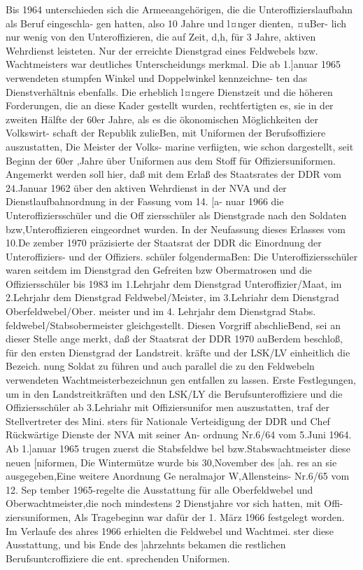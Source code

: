 

Bis 1964 unterschieden sich die Armeeangehörigen,
die die Unteroffizierslaufbahn als Beruf eingeschla-
gen hatten, also 10 Jahre und l¤nger dienten, ¤uBer-
lich nur wenig von den Unteroffizieren, die auf
Zeit, d,h, für 3 Jahre, aktiven Wehrdienst leisteten.
Nur der erreichte Dienstgrad eines Feldwebels bzw.
Wachtmeisters war deutliches Unterscheidungs
merkmal. Die ab 1.]anuar 1965 verwendeten
stumpfen Winkel und Doppelwinkel kennzeichne-
ten das Dienstverhältnis ebenfalls. Die erheblich
l¤ngere Dienstzeit und die höheren Forderungen,
die an diese Kader gestellt wurden, rechtfertigten
es, sie in der zweiten Hälfte der 60er Jahre, als es
die ökonomischen Möglichkeiten der Volkswirt-
schaft der Republik zulieBen, mit Uniformen der
Berufsoffiziere auszustatten, Die Meister der Volks-
marine verfiigten, wie schon dargestellt, seit Beginn
der 60er ,Jahre über Uniformen aus dem Stoff für
Offiziersuniformen.
Angemerkt werden soll hier, daß mit dem Erlaß
des Staatsrates der DDR vom 24.Januar 1962 über
den aktiven Wehrdienst in der NVA und der Dienstlaufbahnordnung in der Fassung vom 14. [a-
nuar 1966 die Unteroffiziersschüler und die Off
ziersschüler als Dienstgrade nach den Soldaten
bzw,Unteroffizieren eingeordnet wurden.
In der Neufassung dieses Erlasses vom 10.De
zember 1970 präzisierte der Staatsrat der DDR dic
Einordnung der Unteroffiziers- und der Offiziers.
schüler folgendermaBen: Die Unteroffiziersschüler
waren seitdem im Dienstgrad den Gefreiten bzw
Obermatrosen und die Offiziersschüler bis 1983 im
1.Lehrjahr dem Dienstgrad Unteroffizier/Maat, im
2.Lehrjahr dem Dienstgrad Feldwebel/Meister, im
3.Lehriahr dem Dienstgrad Oberfeldwebel/Ober.
meister und im 4. Lehrjahr dem Dienstgrad Stabs.
feldwebel/Stabsobermeister gleichgestellt. Diesen
Vorgriff abschlieBend, sei an dieser Stelle ange
merkt, daß der Staatsrat der DDR 1970 auBerdem
beschloß, für den ersten Dienstgrad der Landstreit.
kräfte und der LSK/LV einheitlich die Bezeich.
nung Soldat zu führen und auch parallel die zu den
Feldwebeln verwendeten Wachtmeisterbezeichnun
gen entfallen zu lassen.
Erste Festlegungen, um in den Landstreitkräften
und den LSK/LY die Berufsunteroffiziere und die
Offiziersschüler ab 3.Lehriahr mit Offiziersunifor
men auszustatten, traf der Stellvertreter des Mini.
sters für Nationale Verteidigung der DDR und
Chef Rückwärtige Dienste der NVA mit seiner An-
ordnung Nr.6/64 vom 5.Juni 1964.
Ab 1.]anuar 1965 trugen zuerst die Stabsfeldwe
bel bzw.Stabswachtmeister diese neuen [niformen,
Die Wintermütze wurde bis 30,November des [ah.
res an sie ausgegeben,Eine weitere Anordnung Ge
neralmajor W,Allensteins- Nr.6/65 vom 12. Sep
tember 1965-regelte die Ausstattung für alle
Oberfeldwebel und Oberwachtmeister,die noch
mindestens 2 Dienstjahre vor sich hatten, mit Offi-
ziersuniformen, Als Tragebeginn war dafür der
1. März 1966 festgelegt worden. Im Verlaufe des
ahres 1966 erhielten die Feldwebel und Wachtmei.
ster diese Ausstattung, und bis Ende des ]ahrzehnts
bekamen die restlichen Berufsuntcroffiziere die ent.
sprechenden Uniformen.

